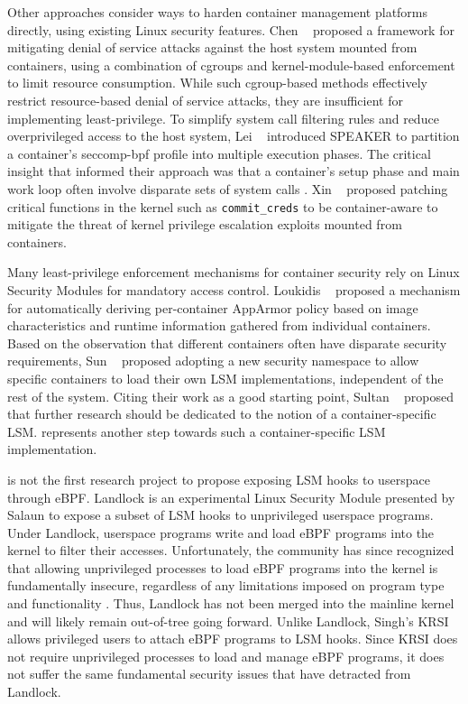 Other approaches consider ways to harden container management platforms directly, using existing Linux security features. Chen \etal~\cite{chen2019_container_dos} proposed a framework for mitigating denial of service attacks against the host system mounted from containers, using a combination of cgroups and kernel-module-based enforcement to limit resource consumption. While such cgroup-based methods effectively restrict resource-based denial of service attacks, they are insufficient for implementing least-privilege. To simplify system call filtering rules and reduce overprivileged access to the host system, Lei \etal~\cite{lei2017_speaker} introduced SPEAKER to partition a container's seccomp-bpf profile into multiple execution phases. The critical insight that informed their approach was that a container's setup phase and main work loop often involve disparate sets of system calls \cite{lei2017_speaker}. Xin \etal~\cite{xin2018_container_security} proposed patching critical functions in the kernel such as \texttt{commit\_creds} to be container-aware to mitigate the threat of kernel privilege escalation exploits mounted from containers.

Many least-privilege enforcement mechanisms for container security rely on Linux Security Modules for mandatory access control. Loukidis \etal~\cite{loukidis2018_dockersec} proposed a mechanism for automatically deriving per-container AppArmor policy based on image characteristics and runtime information gathered from individual containers. Based on the observation that different containers often have disparate security requirements, Sun \etal~\cite{sun2018_security_namespace} proposed adopting a new security namespace to allow specific containers to load their own LSM implementations, independent of the rest of the system. Citing their work as a good starting point, Sultan \etal~\cite{sultan2019_container_security} proposed that further research should be dedicated to the notion of a container-specific LSM. \bpfcontain{} represents another step towards such a container-specific LSM implementation.

\bpfcontain{} is not the first research project to propose exposing LSM hooks to userspace through eBPF. Landlock \cite{landlockio,landlock_patch} is an experimental Linux Security Module presented by Salaun to expose a subset of LSM hooks to unprivileged userspace programs. Under Landlock, userspace programs write and load eBPF programs into the kernel to filter their accesses. Unfortunately, the community has since recognized that allowing unprivileged processes to load eBPF programs into the kernel is fundamentally insecure, regardless of any limitations imposed on program type and functionality \cite{corbet2019_krsi}. Thus, Landlock has not been merged into the mainline kernel and will likely remain out-of-tree going forward. Unlike Landlock, Singh's KRSI \cite{corbet2019_krsi,singh2019_krsi} allows privileged users to attach eBPF programs to LSM hooks. Since KRSI does not require unprivileged processes to load and manage eBPF programs, it does not suffer the same fundamental security issues that have detracted from Landlock.

